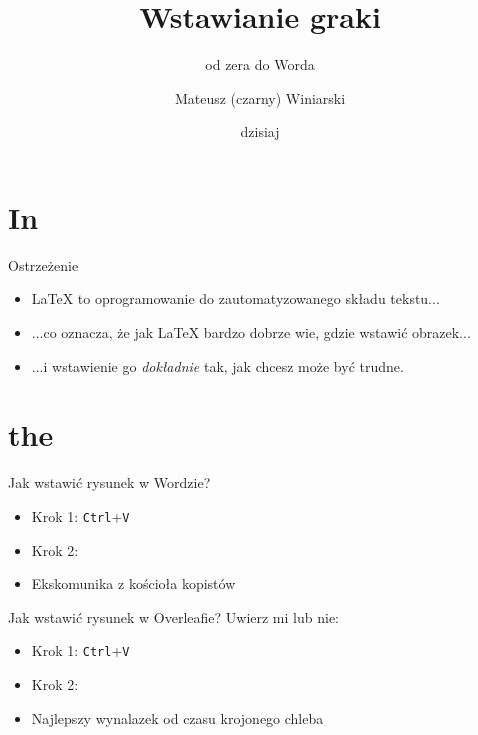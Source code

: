 \documentclass{beamer}
\title{Wstawianie gra\varphi{}ki}
\subtitle{od zera do Worda}
\author[M. Winiarski]{Mateusz (czarny) Winiarski}
\institute[KMPS UJ]{KMPS UJ, WFAIS}
\date[dzisiaj]{dzisiaj}
\begin{document}
\section{In}
\frame{\titlepage}

\begin{frame}{Ostrzeżenie}{}
\begin{itemize}[<+->]
    \item \LaTeX{} to oprogramowanie do zautomatyzowanego składu tekstu...
    \item ...co oznacza, że jak \LaTeX{} bardzo dobrze wie, gdzie wstawić obrazek...
    \item ...i wstawienie go \emph{dokładnie} tak, jak chcesz może być trudne.
\end{itemize}    
\end{frame}

\section{the}

\begin{frame}{Jak wstawić rysunek w Wordzie?}
\Large
\begin{itemize}[<+->]
    \item Krok 1: \texttt{Ctrl}+\texttt{V}
    \item Krok 2: 
    \item Ekskomunika z kościoła kopistów
\end{itemize}
    
\end{frame}

\begin{frame}{Jak wstawić rysunek w Overleafie?}
\Large
Uwierz mi lub nie:
\begin{itemize}[<+->]
    \item Krok 1: \texttt{Ctrl}+\texttt{V}
    \item Krok 2: 
    \item Najlepszy wynalazek od czasu krojonego chleba
\end{itemize}

    
\end{frame}
\end{document}
